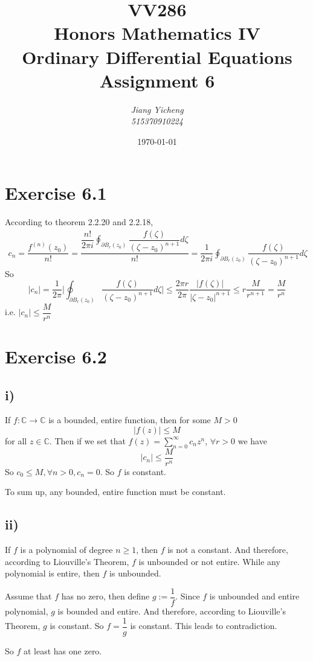 \documentclass[a4paper,12pt,titlepage]{article}
\author{\textit{Jiang Yicheng}\\\textit{515370910224}}
\title{\textbf{VV286\\ Honors Mathematics IV\\
Ordinary Differential Equations\\
		Assignment 6}}
\date{\today}
\begin{document}
\maketitle

\section*{Exercise 6.1}
According to theorem 2.2.20 and 2.2.18,
\begin{align*}
c_n=\dfrac{f^{(n)}(z_0)}{n!}=\dfrac{\dfrac{n!}{2\pi i}\oint_{\partial B_r(z_0) }\dfrac{f(\zeta)}{(\zeta-z_0)^{n+1}}d\zeta}{n!}=\dfrac{1}{2\pi i}\oint_{\partial B_r(z_0) }\dfrac{f(\zeta)}{(\zeta-z_0)^{n+1}}d\zeta
\end{align*}
So
$$|c_n|=\dfrac{1}{2\pi}\Big|\oint_{\partial B_r(z_0) }\dfrac{f(\zeta)}{(\zeta-z_0)^{n+1}}d\zeta\Big|\leqslant\dfrac{2\pi r}{2\pi}\dfrac{|f(\zeta)|}{|\zeta-z_0|^{n+1}}\leqslant r\dfrac{M}{r^{n+1}}=\dfrac{M}{r^n}$$
i.e. $|c_n|\leqslant\dfrac{M}{r^n}$
\section*{Exercise 6.2}
\subsection*{i)}
If $f:\mathbb{C}\rightarrow\mathbb{C}$ is a bounded, entire function, then for some $M > 0$
$$|f(z)|\leqslant M$$
for all $z\in\mathbb{C}$. Then if we set that $f(z)=\sum\limits_{n=0}^{\infty}c_nz^n$, $\forall r>0$ we have
$$|c_n|\leqslant\dfrac{M}{r^n}$$
So $c_0\leqslant M, \forall n>0,c_n=0$. So $f$ is constant.

To sum up, any bounded, entire function must be constant.

\subsection*{ii)}
If $f$ is a polynomial of degree $n \geqslant 1$, then $f$ is not a constant. And therefore, according to Liouville's Theorem, $f$ is unbounded or not entire. While any polynomial is entire, then $f$ is unbounded.

Assume that $f$ has no zero, then define $g:=\dfrac{1}{f}$. Since $f$ is unbounded and entire polynomial, $g$ is bounded and entire. And therefore, according to Liouville's Theorem, $g$ is constant. So $f=\dfrac{1}{g}$ is constant. This leads to contradiction. 

So $f$ at least has one zero.
\end{document}
